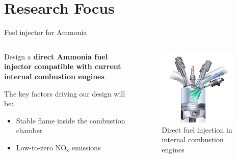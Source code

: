 \section{Research Focus}

\begin{frame}{Fuel injector for Ammonia}

    \begin{columns}[c, onlytextwidth]

        \begin{column}{0.5\textwidth}

            Design a \textbf{direct Ammonia fuel injector compatible with current internal combustion engines}.

            \vspace{9pt}

            The key factors driving our design will be:

            \begin{itemize}
                \item Stable flame inside the combustion chamber
                \item Low-to-zero $\mathrm{NO_x}$ emissions
            \end{itemize}

        \end{column}

        \begin{column}{0.5\textwidth}

            \begin{figure}[H]
                \centering
                \includegraphics[width=0.9\textwidth]{img/injectors-in-ICE.png}
                \caption{Direct fuel injection in internal combustion engines}
            \end{figure}

        \end{column}

    \end{columns}

\end{frame}



